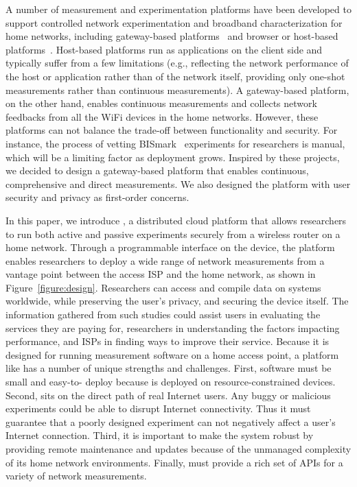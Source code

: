 A number of measurement and experimentation platforms have been developed to 
support controlled network experimentation and broadband characterization 
for home networks, including gateway-based platforms~\cite{bajpai2014lessons,
samknows,183951,yiakoumis2014behop} and browser or host-based platforms~\cite{
dhawan2012fathom,kreibich2010netalyzr,sanchez2014measurement}. Host-based 
platforms run as applications on the client side and typically suffer from a 
few limitations (e.g., reflecting the network performance of the host or 
application rather than of the network itself, providing only one-shot 
measurements rather than continuous measurements). A gateway-based platform, 
on the other hand, enables continuous measurements and collects network 
feedbacks from all the WiFi devices in the home networks. However, these 
platforms can not balance the trade-off between functionality and security.
 For instance, the process of vetting BISmark~\cite{183951} experiments for 
researchers is manual, which will be a limiting factor as deployment grows. 
Inspired by these projects, we decided to design a gateway-based platform 
that enables continuous, comprehensive and direct measurements. We also 
designed the platform with user security and privacy as first-order concerns.
 
In this paper, we introduce \sysname, a distributed cloud platform that 
allows researchers to run both active and passive experiments securely from 
a wireless router on a home network. Through a programmable interface on the 
device, the platform enables researchers to deploy a wide range of network 
measurements from a vantage point between the access ISP and the home 
network, as shown in Figure~\ref{figure:design}. Researchers can access and 
compile data on systems worldwide, while preserving the user's privacy, and 
securing the device itself. The information gathered from such studies could 
assist users in evaluating the services they are paying for, researchers in 
understanding the factors impacting performance, and ISPs in finding ways to 
improve their service. Because it is designed for running measurement 
software on a home access point, a platform like \sysname has a number of 
unique strengths and challenges. First, software must be small and easy-to-
deploy because \sysname is deployed on resource-constrained devices. Second, 
\sysname sits on the direct path of real Internet users. Any buggy or 
malicious experiments could be able to disrupt Internet connectivity. Thus 
it must guarantee that a poorly designed experiment can not negatively 
affect a user's Internet connection. Third, it is important to make the 
system robust by providing remote maintenance and updates because of the 
unmanaged complexity of its home network environments. Finally, \sysname 
must provide a rich set of APIs for a variety of network measurements. 

